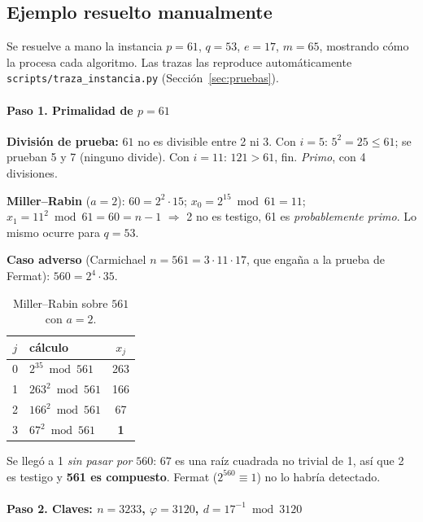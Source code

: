 \subsection{Ejemplo resuelto manualmente}
\label{sec:instancia}

Se resuelve a mano la instancia $p = 61$, $q = 53$, $e = 17$, $m = 65$,
mostrando cómo la procesa cada algoritmo. Las trazas las reproduce
automáticamente \texttt{scripts/traza\_instancia.py} (Sección~\ref{sec:pruebas}).

\paragraph{Paso 1. Primalidad de $p = 61$}

\textbf{División de prueba:} $61$ no es divisible entre 2 ni 3. Con $i = 5$:
$5^2 = 25 \le 61$; se prueban 5 y 7 (ninguno divide). Con $i = 11$:
$121 > 61$, fin. \emph{Primo}, con 4 divisiones.

\textbf{Miller--Rabin} ($a = 2$): $60 = 2^2 \cdot 15$;
$x_0 = 2^{15} \bmod 61 = 11$; $x_1 = 11^2 \bmod 61 = 60 = n - 1$ $\Rightarrow$ 2 no
es testigo, 61 es \emph{probablemente primo}. Lo mismo ocurre para $q = 53$.

\textbf{Caso adverso} (Carmichael $n = 561 = 3\cdot11\cdot17$, que engaña a la
prueba de Fermat): $560 = 2^4 \cdot 35$.

\begin{table}[H]
\centering\small
\caption{Miller--Rabin sobre $561$ con $a = 2$.}
\label{tab:traza-mr}
\begin{tabular}{@{}c l c@{}}
\toprule
$j$ & cálculo & $x_j$\\
\midrule
0 & $2^{35} \bmod 561$ & 263\\
1 & $263^2 \bmod 561$ & 166\\
2 & $166^2 \bmod 561$ & 67\\
3 & $67^2 \bmod 561$ & \textbf{1}\\
\bottomrule
\end{tabular}
\end{table}
\noindent Se llegó a 1 \emph{sin pasar por} $560$: $67$ es una raíz cuadrada no
trivial de 1, así que 2 es testigo y \textbf{561 es compuesto}. Fermat
($2^{560} \equiv 1$) no lo habría detectado.

\paragraph{Paso 2. Claves: $n = 3233$, $\varphi = 3120$, $d = 17^{-1} \bmod 3120$}

